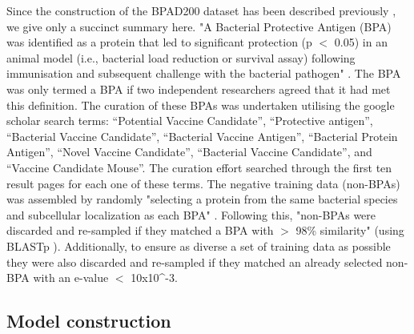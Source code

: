 \documentclass[10pt,journal,compsoc,twoside]{IEEEtran}
\begin{document}
Since the construction of the BPAD200 dataset has been described previously \cite{heinson_2017}, we give only a succinct summary here. "A Bacterial Protective Antigen (BPA) was identified as a protein that led to significant protection (p $<$ 0.05) in an animal model (i.e., bacterial load reduction or survival assay) following immunisation and subsequent challenge with the bacterial pathogen" \cite{heinson_2017}. The BPA was only termed a BPA if two independent researchers agreed that it had met this definition. The curation of these BPAs was undertaken utilising the google scholar search terms: “Potential Vaccine Candidate”, “Protective antigen”, “Bacterial Vaccine Candidate”, “Bacterial Vaccine Antigen”, “Bacterial Protein Antigen”, “Novel Vaccine Candidate”, “Bacterial Vaccine Candidate”, and “Vaccine Candidate Mouse”. The curation effort searched through the first ten result pages for each one of these terms. The negative training data (non-BPAs) was assembled by randomly "selecting a protein from the same bacterial species and subcellular localization as each BPA" \cite{heinson_2017}. Following this, "non-BPAs were discarded and re-sampled if they matched a BPA with $>$ 98\% similarity" \cite{heinson_2019} (using BLASTp \cite{blast}). Additionally, to ensure as diverse a set of training data as possible they were also discarded and re-sampled if they matched an already selected non-BPA with an e-value $<$ 10x10^-3\cite{heinson_2017}\cite{blast}.


\subsection{Model construction}
\label{sec:methods2}
\end{document}
